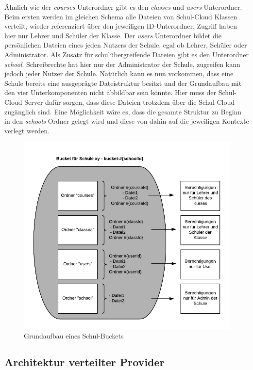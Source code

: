 Ähnlich wie der \textit{courses} Unterordner gibt es den \textit{classes} und \textit{users} Unterordner. Beim ersten werden im gleichen Schema alle Dateien von Schul-Cloud Klassen verteilt, wieder referenziert über den jeweiligen ID-Unterordner. Zugriff haben hier nur Lehrer und Schüler der Klasse. Der \textit{users} Unterordner bildet die persönlichen Dateien eines jeden Nutzers der Schule, egal ob Lehrer, Schüler oder Administrator. Als Zusatz für schulübergreifende Dateien gibt es den Unterordner \textit{school}. Schreibrechte hat hier nur der Administrator der Schule, zugreifen kann jedoch jeder Nutzer der Schule. Natürlich kann es nun vorkommen, dass eine Schule bereits eine ausgeprägte Dateistruktur besitzt und der Grundaufbau mit den vier Unterkomponenten nicht abbildbar sein könnte. Hier muss der Schul-Cloud Server dafür sorgen, dass diese Dateien trotzdem über die Schul-Cloud zugänglich sind. Eine Möglichkeit wäre es, dass die gesamte Struktur zu Beginn in den \textit{schools} Ordner gelegt wird und diese von dahin auf die jeweiligen Kontexte verlegt werden.

\begin{figure}[H]
	\centering
	\includegraphics[width=0.8\linewidth]{images/AufbauDateiverwaltung}
	\caption[Caption for concept]{Grundaufbau eines Schul-Buckets}
	\label{fig:aufbau}
\end{figure}

\subsection{Architektur verteilter Provider}
\label{sec:strategypatternconcept}

